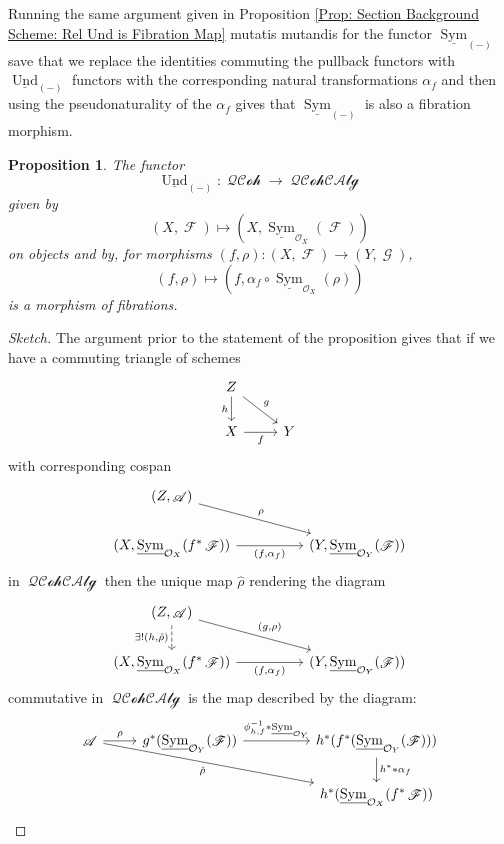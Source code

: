 \documentclass{amsart}
\newtheorem{proposition}[equation]{Proposition}
\theoremstyle{definition}
\DeclareMathOperator{\Ascr}{\mathscr{A}}
\DeclareMathOperator{\Fscr}{\mathscr{F}}
\DeclareMathOperator{\Gscr}{\mathscr{G}}
\DeclareMathOperator{\Ocal}{\mathcal{O}}
\DeclareMathOperator{\sym}{Sym}
\DeclareMathOperator{\und}{Und}
\newcommand{\RelSym}[1]{\underline{\sym}_{{#1}}}
\newcommand{\RelUnd}[1]{\underline{\und}_{{#1}}}
\DeclareMathOperator{\QQCoh}{\mathcal{QCoh}}
\DeclareMathOperator{\QQCAlg}{\mathcal{QCohCAlg}}
\numberwithin{equation}{subsection}
\begin{document}
Running the same argument given in Proposition \ref{Prop: Section Background Scheme: Rel Und is Fibration Map} mutatis mutandis for the functor $\RelSym{(-)}$ save that we replace the identities commuting the pullback functors with $\RelUnd{(-)}$ functors with the corresponding natural transformations $\alpha_f$ and then using the pseudonaturality of the $\alpha_f$ gives that $\RelSym{(-)}$ is also a fibration morphism.
\begin{proposition}\label{Prop: Section Background Scheme: Rel Sym is Fibration Map}
	The functor
	\[
	\RelUnd{(-)}:\QQCoh \to \QQCAlg
	\]
	given by
	\[
	(X,\Fscr) \mapsto \left(X,\RelSym{\Ocal_X}(\Fscr)\right)
	\]
	on objects and by, for morphisms $(f,\rho):(X,\Fscr) \to (Y,\Gscr)$,
	\[
	(f,\rho) \mapsto (f, \alpha_f \circ \RelSym{\Ocal_X}(\rho))
	\]
	is a morphism of fibrations.
\end{proposition}
\begin{proof}[Sketch]
The argument prior to the statement of the proposition gives that if we have a commuting triangle of schemes
\[
\begin{tikzcd}
Z \ar[dr]{}{g} \ar[d, swap]{}{h} & \\
X \ar[r, swap]{}{f} & Y
\end{tikzcd}
\]
with corresponding cospan 
\[
\begin{tikzcd}
(Z,\Ascr) \ar[drr]{}{\rho} \\
(X,\RelSym{\Ocal_X}(f^{\ast}\Fscr)) \ar[rr, swap]{}{(f, \alpha_f)} & & (Y, \RelSym{\Ocal_Y}(\Fscr))
\end{tikzcd}
\]
in $\QQCAlg$ then the unique map $\hat{\rho}$ rendering the diagram
\[
\begin{tikzcd}
(Z,\Ascr) \ar[drr]{}{(g,\rho)} \ar[d, dashed, swap]{}{\exists!(h,\hat{\rho})} \\
(X,\RelSym{\Ocal_X}(f^{\ast}\Fscr)) \ar[rr, swap]{}{(f, \alpha_f)} & & (Y,\RelSym{\Ocal_Y}(\Fscr))
\end{tikzcd}
\]
commutative in $\QQCAlg$ is the map  described by the diagram:
\[
\begin{tikzcd}
\Ascr \ar[r]{}{\rho} \ar[drrr, swap]{}{\hat{\rho}} & g^{\ast}(\RelSym{\Ocal_Y}(\Fscr)) \ar[rr]{}{\phi_{h,f}^{-1} \ast \RelSym{\Ocal_Y}} & & h^{\ast}(f^{\ast}(\RelSym{\Ocal_Y}(\Fscr))) \ar[d]{}{h^{\ast} \ast \alpha_f} \\
 & & & h^{\ast}(\RelSym{\Ocal_X}(f^{\ast}\Fscr))
\end{tikzcd}
\]
\end{proof}
\end{document}
